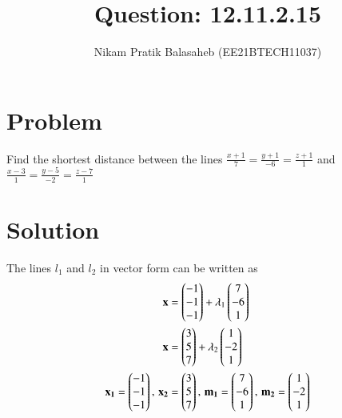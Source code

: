 \documentclass[journal,12pt,twocolumn]{IEEEtran}
\begin{document}
\vspace{3cm}


\title{Question: 12.11.2.15}
\author{Nikam Pratik Balasaheb (EE21BTECH11037)}





\maketitle

\newpage


\bigskip

\renewcommand{\thefigure}{\theenumi}
\renewcommand{\thetable}{\theenumi}

\section{Problem}
Find the shortest distance between the lines $\frac{x+1}{7} = \frac{y+1}{-6}=\frac{z+1}{1}$ and $\frac{x-3}{1} = \frac{y-5}{-2}=\frac{z-7}{1}$

\section{Solution}
 The lines $l_1$ and $l_2$ in vector form can be written as
\begin{align}
\mathbf{x} &= \begin{pmatrix}-1\\-1\\-1\end{pmatrix} + \lambda_1\begin{pmatrix}7\\-6\\1\end{pmatrix}\\
\mathbf{x} &= \begin{pmatrix}3\\5\\7\end{pmatrix} + \lambda_2\begin{pmatrix}1\\-2\\1\end{pmatrix} \\
\mathbf{x_1} = \begin{pmatrix}-1\\-1\\-1\end{pmatrix},\, \mathbf{x_2} &= \begin{pmatrix}3\\5\\7\end{pmatrix}, \,\mathbf{m_1} = \begin{pmatrix}7\\-6\\1\end{pmatrix}, \, \mathbf{m_2} = \begin{pmatrix}1\\-2\\1\end{pmatrix}
\end{align}
\end{document}
